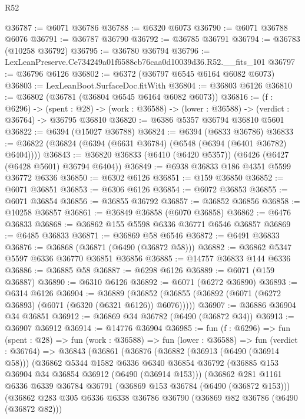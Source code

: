 \begin{lexlean}{R52}
\begin{coremodule}
@36787 := @6071 @36786
@36788 := @6320 @6073
@36790 := @6071 @36788 @6076
@36791 := @36787 @36790
@36792 := @36785 @36791
@36794 := @36783 (@10258 @36792)
@36795 := @36780 @36794
@36796 := LexLeanPreserve.Ce734249a01f6588cb76caa0d10039d36.R52.__fits_101
@36797 := @36796 @6126
@36802 := @6372 (@36797 @6545 @6164 @6082 @6073)
@36803 := LexLeanBoot.SurfaceDoc.fitWith
@36804 := @36803 @6126
@36810 := @36802 (@36781 (@36804 @6545 @6164 @6082 @6073))
@36816 := (f : @6296) ->
  (spent : @28) -> (work : @36588) -> (lower : @36588) -> (verdict : @36764) -> @36795 @36810
@36820 := @6386 @5357 @36794 @36810 @5601
@36822 := @6394 (@15027 @36788)
@36824 := @6394 (@6833 @36786)
@36833 := @36822 (@36824 (@6394 (@6631 @36784) (@6548 (@6394 (@6401 @36782) @6404))))
@36843 := @36820 @36833 (@6410 (@6420 @5357)) (@6426 (@6427 (@6428 @5601) @36794 @6404))
@36849 := @6938 @36833 @186 @4351 @5599 @36772 @6336
@36850 := @6302 @6126
@36851 := @159 @36850
@36852 := @6071 @36851
@36853 := @6306 @6126
@36854 := @6072 @36853
@36855 := @6071 @36854
@36856 := @36855 @36792
@36857 := @36852 @36856
@36858 := @10258 @36857
@36861 := @36849 @36858 (@6070 @36858)
@36862 := @6476 @36833
@36868 := @36862 @155 @5598 @6336 @36771 @6546 @36857
@36869 := @6485 @36833
@36871 := @36869 @58 @6546
@36872 := @6491 @36833
@36876 := @36868 (@36871 (@6490 (@36872 @58)))
@36882 := @36862 @5347 @5597 @6336 @36770 @36851 @36856
@36885 := @14757 @36833 @144 @6336
@36886 := @36885 @58
@36887 := @6298 @6126
@36889 := @6071 (@159 @36887)
@36890 := @6310 @6126
@36892 := @6071 (@6272 @36890)
@36893 := @6314 @6126
@36904 := @36889
    (@36852 (@36855 (@36892 (@6071 (@6272 @36893) (@6071 (@6320 (@6321 @6126)) @6076)))))
@36907 := @36886 @36904 @34 @36851
@36912 := @36869 @34 @36782 (@6490 (@36872 @34))
@36913 := @36907 @36912
@36914 := @14776 @36904
@36985 := fun (f : @6296) =>
  fun (spent : @28) =>
  fun (work : @36588) =>
  fun (lower : @36588) =>
  fun (verdict : @36764) =>
  @36843
    (@36861
      (@36876
        (@36882
          (@36913 (@6490 (@36914 @58)))
          (@36862
            @5344
            @1582
            @6336
            @6340
            @36854
            @36792
            (@36885 @153 @36904 @34 @36854 @36912 (@6490 (@36914 @153)))
            (@36862
              @281
              @1161
              @6336
              @6339
              @36784
              @36791
              (@36869 @153 @36784 (@6490 (@36872 @153)))
              (@36862
                @283
                @305
                @6336
                @6338
                @36786
                @36790
                (@36869 @82 @36786 (@6490 (@36872 @82)))

\end{coremodule}
\end{lexlean}
